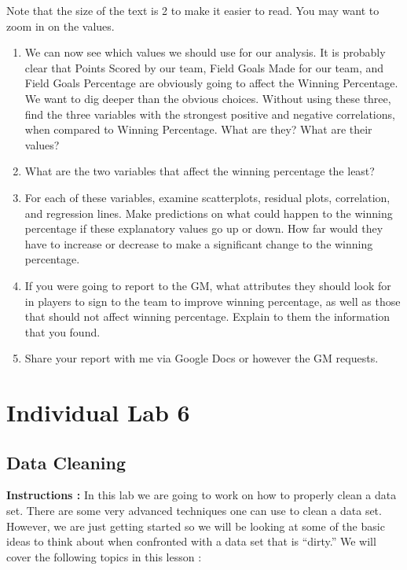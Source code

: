 \documentclass[
  letterpaper,
  DIV=11,
  numbers=noendperiod]{scrreprt}
\begin{document}
Note that the size of the text is 2 to make it easier to read. You may
want to zoom in on the values.

\begin{enumerate}
\def\labelenumi{\arabic{enumi}.}
\setcounter{enumi}{10}
\item
  We can now see which values we should use for our analysis. It is
  probably clear that Points Scored by our team, Field Goals Made for
  our team, and Field Goals Percentage are obviously going to affect the
  Winning Percentage. We want to dig deeper than the obvious choices.
  Without using these three, find the three variables with the strongest
  positive and negative correlations, when compared to Winning
  Percentage. What are they? What are their values?
\item
  What are the two variables that affect the winning percentage the
  least?
\item
  For each of these variables, examine scatterplots, residual plots,
  correlation, and regression lines. Make predictions on what could
  happen to the winning percentage if these explanatory values go up or
  down. How far would they have to increase or decrease to make a
  significant change to the winning percentage.
\item
  If you were going to report to the GM, what attributes they should
  look for in players to sign to the team to improve winning percentage,
  as well as those that should not affect winning percentage. Explain to
  them the information that you found.
\item
  Share your report with me via Google Docs or however the GM requests.
\end{enumerate}

\chapter*{Individual Lab 6}\label{individual-lab-6}


\section*{Data Cleaning}\label{data-cleaning}


\textbf{Instructions :} In this lab we are going to work on how to
properly clean a data set. There are some very advanced techniques one
can use to clean a data set. However, we are just getting started so we
will be looking at some of the basic ideas to think about when
confronted with a data set that is ``dirty.'' We will cover the
following topics in this lesson :
\end{document}
